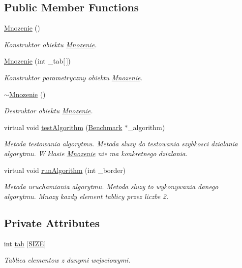 \subsection*{Public Member Functions}
\begin{DoxyCompactItemize}
\item 
\hyperlink{class_mnozenie_aac38391baa7ffd14970526902ab750de}{Mnozenie} ()
\begin{DoxyCompactList}\small\item\em Konstruktor obiektu \hyperlink{class_mnozenie}{Mnozenie}. \end{DoxyCompactList}\item 
\hyperlink{class_mnozenie_a8babd869ba0bd289e1e4287d6d8b56f2}{Mnozenie} (int \+\_\+tab\mbox{[}$\,$\mbox{]})
\begin{DoxyCompactList}\small\item\em Konstruktor parametryczny obiektu \hyperlink{class_mnozenie}{Mnozenie}. \end{DoxyCompactList}\item 
\hyperlink{class_mnozenie_ad57f03bc66770fb6a442169781ee2156}{$\sim$\+Mnozenie} ()
\begin{DoxyCompactList}\small\item\em Destruktor obiektu \hyperlink{class_mnozenie}{Mnozenie}. \end{DoxyCompactList}\item 
virtual void \hyperlink{class_mnozenie_a039792aaa5ce9723cd61d29869cf0101}{test\+Algorithm} (\hyperlink{class_benchmark}{Benchmark} $\ast$\+\_\+algorithm)
\begin{DoxyCompactList}\small\item\em Metoda testowania algorytmu. Metoda sluzy do testowania szybkosci dzialania algorytmu. W klasie \hyperlink{class_mnozenie}{Mnozenie} nie ma konkretnego dzialania. \end{DoxyCompactList}\item 
virtual void \hyperlink{class_mnozenie_a46b1c55b7ba208fa137065147e107be9}{run\+Algorithm} (int \+\_\+border)
\begin{DoxyCompactList}\small\item\em Metoda uruchamiania algorytmu. Metoda sluzy to wykonywania danego algorytmu. Mnozy kazdy element tablicy przez liczbe 2. \end{DoxyCompactList}\end{DoxyCompactItemize}
\subsection*{Private Attributes}
\begin{DoxyCompactItemize}
\item 
int \hyperlink{class_mnozenie_a6dc67671f84a557d97c322b8af528359}{tab} \mbox{[}\hyperlink{benchmark_8hh_a70ed59adcb4159ac551058053e649640}{S\+I\+Z\+E}\mbox{]}
\begin{DoxyCompactList}\small\item\em Tablica elementow z danymi wejsciowymi. \end{DoxyCompactList}\end{DoxyCompactItemize}


